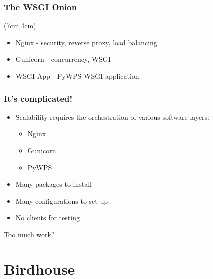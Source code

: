 \documentclass{beamer}
\begin{document}
\begin{frame}
\frametitle<presentation>{The WSGI Onion}


\begin{textblock*}{5cm}(7cm,4cm)
\begin{itemize}
  \item Nginx - security, reverse proxy, load balancing
  \item Gunicorn - concurrency, WSGI
  \item WSGI App - PyWPS WSGI application
\end{itemize}
\end{textblock*}
\end{frame}


\begin{frame}
\frametitle<presentation>{It's complicated!}

\begin{itemize}

  \item Scalability requires the orchestration of various software layers:
   \begin{itemize}
	  \item Nginx
	  \item Gunicorn
	  \item PyWPS
	\end{itemize}
  \item Many packages to install
  \item Many configurations to set-up
  \item No clients for testing
\end{itemize}

\vspace{0.4cm}
\centering
\Large{Too much work?}

\end{frame}


\section{Birdhouse}
\end{document}
